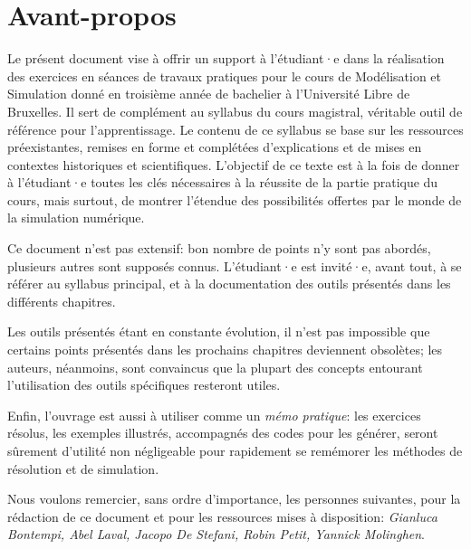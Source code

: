 \chapter*{Avant-propos}
    Le présent document vise à offrir un support à l'étudiant·e dans la réalisation des exercices en séances de travaux pratiques pour le cours de Modélisation et Simulation donné en troisième année de bachelier à l'Université Libre de Bruxelles. Il sert de complément au syllabus du cours magistral, véritable outil de référence pour l'apprentissage.
    Le contenu de ce syllabus se base sur les ressources préexistantes, remises en forme et complétées d'explications et de mises en contextes historiques et scientifiques. L'objectif de ce texte est à la fois de donner à l'étudiant·e toutes les clés nécessaires à la réussite de la partie pratique du cours, mais surtout, de montrer l'étendue des possibilités offertes par le monde de la simulation numérique.

    Ce document n'est pas extensif: bon nombre de points n'y sont pas abordés, plusieurs autres sont supposés connus. L'étudiant·e est invité·e, avant tout, à se référer au syllabus principal, et à la documentation des outils présentés dans les différents chapitres.

    Les outils présentés étant en constante évolution, il n'est pas impossible que certains points présentés dans les prochains chapitres deviennent obsolètes; les auteurs, néanmoins, sont convaincus que la plupart des concepts entourant l'utilisation des outils spécifiques resteront utiles.

    Enfin, l'ouvrage est aussi à utiliser comme un \textit{mémo pratique}: les exercices résolus, les exemples illustrés, accompagnés des codes pour les générer, seront sûrement d'utilité non négligeable pour rapidement se remémorer les méthodes de résolution et de simulation.

    Nous voulons remercier, sans ordre d'importance, les personnes suivantes, pour la rédaction de ce document et pour les ressources mises à disposition: \textit{Gianluca Bontempi, Abel Laval, Jacopo De Stefani, Robin Petit, Yannick Molinghen}.